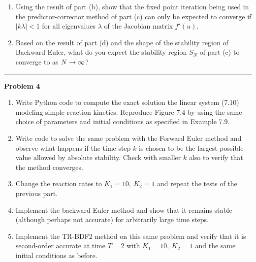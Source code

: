 \documentclass[10pt]{article}
\begin{document}
\begin{enumerate}
\item Using the result of part (b), show that the fixed point iteration
being used in the predictor-corrector method of part (c) can only be
expected to converge if $|k\lambda| < 1$ for all eigenvalues $\lambda$ of
the
Jacobian matrix $f'(u)$.  

\item Based on the result of part (d) and the shape of the stability region
of Backward Euler, what do you expect the stability region $S_N$ of part (c)
to converge to as $N\rightarrow\infty$?

\end{enumerate}





\vskip 1cm
\hrule
{\bf Problem 4}

\begin{enumerate}
\item
Write Python code to compute the exact solution
the linear system (7.10) modeling simple
reaction kinetics.  Reproduce Figure 7.4 by
using the same choice of parameters and initial conditions as specified in
Example 7.9.
\item Write code to solve the same problem with the Forward Euler method and
observe what happens if the time step $k$ is chosen to be the largest
possible value allowed by absolute stability. Check with smaller $k$ also to
verify that the method converges.
\item Change the reaction rates to $K_1=10, ~K_2=1$ and repeat the tests of
the previous part.
\item Implement the backward Euler method and show that it remains stable
(although perhaps not accurate) for arbitrarily large time steps.
\item Implement the TR-BDF2 method on this same problem and verify that it
is second-order accurate at time $T=2$ with $K_1=10, ~K_2=1$ and the same
initial conditions as before.
\end{enumerate} 






\end{document}
